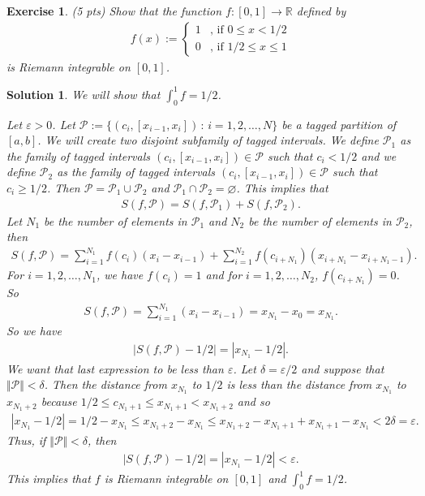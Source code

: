 \documentclass[12pt]{article}
\newcommand{\bR}{\mathbb{R}}
\newcommand{\cP}{\mathcal{P}}
\newcommand{\ra}{\rightarrow}
\theoremstyle{plain}
\newtheorem{exer}{\textbf{Exercise}}}
\theoremstyle{plain}
\newtheorem*{sol}{\textbf{Solution}}}
\theoremstyle{plain}
\theoremstyle{plain}
\begin{document}
\begin{exer}
(5 pts)
Show that the function $f : [0, 1] \ra \bR$ defined by
	\begin{align*}
	f(x) := \begin{cases}
	1 & \text{, if } 0 \leq x < 1/2 \\
	0 & \text{, if } 1/2 \leq x \leq 1 
	\end{cases}
	\end{align*}
is Riemann integrable on $[0, 1]$.
\end{exer}
\begin{sol}
We will show that $\int_0^1 f = 1/2$. 

Let $\varepsilon > 0$. Let $\cP := \{ (c_i , [x_{i-1} , x_i ]) \, : \, i = 1 , 2, \ldots , N \}$ be a tagged partition of $[a, b]$. We will create two disjoint subfamily of tagged intervals. We define $\cP_1$ as the family of tagged intervals $(c_i , [x_{i - 1} , x_i] ) \in \cP$ such that $c_i < 1/2$ and we define $\cP_2$ as the family of tagged intervals $(c_i , [x_{i-1} , x_i]) \in \cP$ such that $c_i \geq 1/2$. Then $\cP = \cP_1 \cup \cP_2$ and $\cP_1 \cap \cP_2 = \varnothing$. This implies that
	\begin{align*}
	S (f , \cP ) = S (f, \cP_1) + S (f , \cP_2 ).
	\end{align*}
Let $N_1$ be the number of elements in $\cP_1$ and $N_2$ be the number of elements in $\cP_2$, then
	\begin{align*}
	S (f, \cP ) = \sum_{i = 1}^{N_1} f(c_i) (x_i - x_{i-1}) + \sum_{i = 1}^{N_2} f(c_{i + N_1}) (x_{i + N_1} - x_{i + N_1 -1}) .
	\end{align*}
For $i = 1 , 2, \ldots , N_1$, we have $f(c_i) = 1$ and for $i = 1, 2, \ldots , N_2$, $f(c_{i + N_1}) = 0$. So
	\begin{align*}
	S (f , \cP ) = \sum_{i = 1}^{N_1} (x_{i} - x_{i - 1}) = x_{N_1} - x_0 = x_{N_1} .
	\end{align*}
So we have
	\begin{align*}
	| S(f , \cP ) - 1/2| = |x_{N_1} - 1/2| .
	\end{align*}
We want that last expression to be less than $\varepsilon$. Let $\delta = \varepsilon/2$ and suppose that $\Vert \cP \Vert < \delta$. Then the distance from $x_{N_1}$ to $1/2$ is less than the distance from $x_{N_1}$ to $x_{N_1 + 2}$ because $1/2 \leq c_{N_1 + 1} \leq x_{N_1 + 1} < x_{N_1 + 2}$ and so
	\begin{align*}
	|x_{N_1} - 1/2| = 1/2 - x_{N_1} \leq x_{N_1 + 2} - x_{N_1} \leq x_{N_1 + 2} - x_{N_1 + 1} + x_{N_1 + 1} - x_{N_1} < 2 \delta = \varepsilon .
	\end{align*}
Thus, if $\Vert \cP \Vert < \delta$, then
	\begin{align*}
	| S (f, \cP ) - 1/2| = |x_{N_1} - 1/2| < \varepsilon .
	\end{align*}
This implies that $f$ is Riemann integrable on $[0, 1]$ and $\int_0^1 f = 1/2$.
\end{sol}
\end{document}
